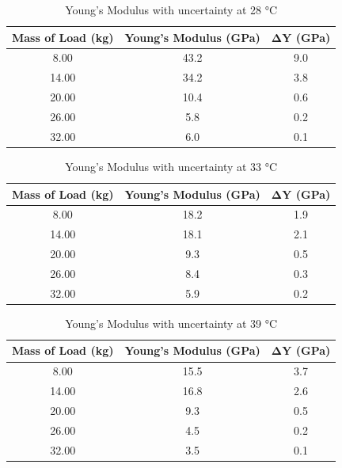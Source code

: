 \documentclass{article}
\begin{document}
\begin{table}[H]
\centering
\caption{Young's Modulus with uncertainty at 28 °C }
\label{tab:my-table}
\begin{tabular}{|c|c|c|}
\hline
\textbf{Mass of Load (kg)} & \textbf{Young's Modulus (GPa)} & \textbf{$\boldsymbol{\Delta Y}$ (GPa)} \\ \hline
8.00 & 43.2 & 9.0 \\ \hline
14.00 & 34.2 & 3.8 \\ \hline
20.00 & 10.4 & 0.6 \\ \hline
26.00 & 5.8 & 0.2 \\ \hline
32.00 & 6.0 & 0.1 \\ \hline
\end{tabular}
\end{table}

\begin{table}[H]
\centering
\caption{ Young’s Modulus with uncertainty at 33 °C}
\label{tab:my-table}
\begin{tabular}{|c|c|c|}
\hline
\textbf{Mass of   Load (kg)} & \textbf{Young's Modulus (GPa)} & \textbf{$\boldsymbol{\Delta Y}$ (GPa)} \\ \hline
8.00 & 18.2 & 1.9 \\ \hline
14.00 & 18.1 & 2.1 \\ \hline
20.00 & 9.3 & 0.5 \\ \hline
26.00 & 8.4 & 0.3 \\ \hline
32.00 & 5.9 & 0.2 \\ \hline
\end{tabular}
\end{table}

\begin{table}[H]
\centering
\caption{Young’s Modulus with uncertainty at 39 °C}
\label{tab:my-table}
\begin{tabular}{|c|c|c|}
\hline
\textbf{Mass of Load (kg)} & \textbf{Young's Modulus (GPa)} & \textbf{$\boldsymbol{\Delta Y}$ (GPa)} \\ \hline
8.00 & 15.5 & 3.7 \\ \hline
14.00 & 16.8 & 2.6 \\ \hline
20.00 & 9.3 & 0.5 \\ \hline
26.00 & 4.5 & 0.2 \\ \hline
32.00 & 3.5 & 0.1 \\ \hline
\end{tabular}
\end{table}
\end{document}
